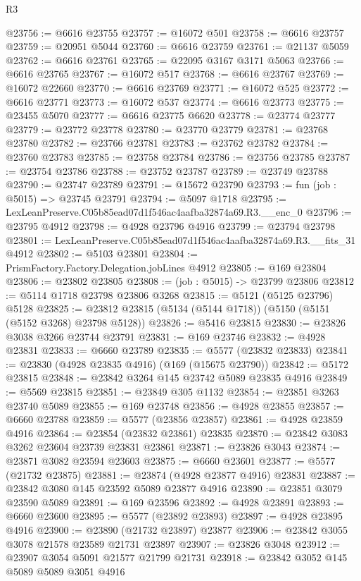 \begin{lexlean}{R3}
\begin{coremodule}
@23756 := @6616 @23755
@23757 := @16072 @501
@23758 := @6616 @23757
@23759 := @20951 @5044
@23760 := @6616 @23759
@23761 := @21137 @5059
@23762 := @6616 @23761
@23765 := @22095 @3167 @3171 @5063
@23766 := @6616 @23765
@23767 := @16072 @517
@23768 := @6616 @23767
@23769 := @16072 @22660
@23770 := @6616 @23769
@23771 := @16072 @525
@23772 := @6616 @23771
@23773 := @16072 @537
@23774 := @6616 @23773
@23775 := @23455 @5070
@23777 := @6616 @23775 @6620
@23778 := @23774 @23777
@23779 := @23772 @23778
@23780 := @23770 @23779
@23781 := @23768 @23780
@23782 := @23766 @23781
@23783 := @23762 @23782
@23784 := @23760 @23783
@23785 := @23758 @23784
@23786 := @23756 @23785
@23787 := @23754 @23786
@23788 := @23752 @23787
@23789 := @23749 @23788
@23790 := @23747 @23789
@23791 := @15672 @23790
@23793 := fun (job : @5015) => @23745 @23791
@23794 := @5097 @1718
@23795 := LexLeanPreserve.C05b85ead07d1f546ac4aafba32874a69.R3.__enc_0
@23796 := @23795 @4912
@23798 := @4928 @23796 @4916
@23799 := @23794 @23798
@23801 := LexLeanPreserve.C05b85ead07d1f546ac4aafba32874a69.R3.__fits_31 @4912
@23802 := @5103 @23801
@23804 := PrismFactory.Factory.Delegation.jobLines @4912
@23805 := @169 @23804
@23806 := @23802 @23805
@23808 := (job : @5015) -> @23799 @23806
@23812 := @5114 @1718 @23798 @23806 @3268
@23815 := @5121 (@5125 @23796) @5128
@23825 := @23812 @23815 (@5134 (@5144 @1718)) (@5150 (@5151 (@5152 @3268) @23798 @5128))
@23826 := @5416 @23815
@23830 := @23826 @3038 @3266 @23744 @23791
@23831 := @169 @23746
@23832 := @4928 @23831
@23833 := @6660 @23789
@23835 := @5577 (@23832 @23833)
@23841 := @23830 (@4928 @23835 @4916) (@169 (@15675 @23790))
@23842 := @5172 @23815
@23848 := @23842 @3264 @145 @23742 @5089 @23835 @4916
@23849 := @5569 @23815
@23851 := @23849 @305 @1132
@23854 := @23851 @3263 @23740 @5089
@23855 := @169 @23748
@23856 := @4928 @23855
@23857 := @6660 @23788
@23859 := @5577 (@23856 @23857)
@23861 := @4928 @23859 @4916
@23864 := @23854 (@23832 @23861) @23835
@23870 := @23842 @3083 @3262 @23604 @23739 @23831 @23861
@23871 := @23826 @3043
@23874 := @23871 @3082 @23594 @23603
@23875 := @6660 @23601
@23877 := @5577 (@21732 @23875)
@23881 := @23874 (@4928 @23877 @4916) @23831
@23887 := @23842 @3080 @145 @23592 @5089 @23877 @4916
@23890 := @23851 @3079 @23590 @5089
@23891 := @169 @23596
@23892 := @4928 @23891
@23893 := @6660 @23600
@23895 := @5577 (@23892 @23893)
@23897 := @4928 @23895 @4916
@23900 := @23890 (@21732 @23897) @23877
@23906 := @23842 @3055 @3078 @21578 @23589 @21731 @23897
@23907 := @23826 @3048
@23912 := @23907 @3054 @5091 @21577 @21799 @21731
@23918 := @23842 @3052 @145 @5089 @5089 @3051 @4916

\end{coremodule}
\end{lexlean}
